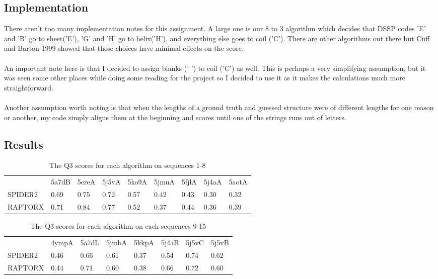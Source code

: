 \documentclass[12pt, oneside]{article}
\begin{document}
\subsection*{Implementation}
There aren't too many implementation notes for this assignment. A large one is our 8 to 3 algorithm which decides that DSSP codes 'E' and 'B' go to sheet('E'), 'G' and 'H' go to helix('H'), and everything else goes to coil ('C'). There are other algorithms out there but Cuff and Barton 1999 showed that these choices have minimal effects on the score. \\ \\
An important note here is that I decided to assign blanks (' ') to coil ('C') as well. This is perhaps a very simplifying assumption, but it was seen some other places while doing some reading for the project so I decided to use it as it makes the calculations much more straightforward. \\ \\
Another assumption worth noting is that when the lengths of a ground truth and guessed structure were of different lengths for one reason or another, my code simply aligns them at the beginning and scores until one of the strings runs out of letters.

\subsection*{Results}
\begin{table}[h!]
\centering
\caption{The Q3 scores for each algorithm on sequences 1-8}
\label{my-label}
\begin{tabular}{lllllllll}
        & 5a7dB & 5ereA & 5j5vA & 5ko9A & 5jmuA & 5fjlA & 5j4aA & 5aotA  \\
SPIDER2 & 0.69  & 0.75  & 0.72  & 0.57  & 0.42  & 0.43  & 0.30  & 0.32   \\
RAPTORX & 0.71  & 0.84  & 0.77  & 0.52  & 0.37  & 0.44  & 0.36  & 0.39 
\end{tabular}
\end{table}

\begin{table}[h!]
\centering
\caption{The Q3 scores for each algorithm on each sequences 9-15}
\label{my-label}
\begin{tabular}{llllllll}
         & 4ympA & 5a7dL & 5jmbA & 5kkpA & 5j4aB & 5j5vC & 5j5vB \\
SPIDER2 &  0.46  & 0.66  & 0.61  & 0.37  & 0.54  & 0.74  & 0.62  \\
RAPTORX  & 0.44  & 0.71  & 0.60  & 0.38  & 0.66  & 0.72  & 0.60 
\end{tabular}
\end{table}
\end{document}
